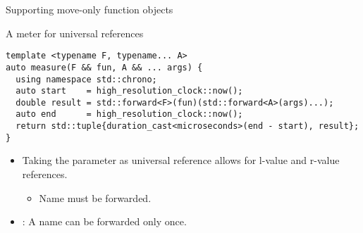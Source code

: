 \begin{frame}[t,fragile]{Supporting move-only function objects}
\begin{block}{A meter for universal references}
\begin{lstlisting}
template <typename F, typename... A>
auto measure(F && fun, A && ... args) {
  using namespace std::chrono;
  auto start    = high_resolution_clock::now();
  double result = std::forward<F>(fun)(std::forward<A>(args)...);
  auto end      = high_resolution_clock::now();
  return std::tuple{duration_cast<microseconds>(end - start), result};
}
\end{lstlisting}
\end{block}

\begin{itemize}
  \item Taking the  parameter as universal reference allows
        for l-value and r-value references.
    \begin{itemize}
      \item Name must be forwarded.
    \end{itemize}
  \item {}: A name can be forwarded only once.
\end{itemize}
\end{frame}
